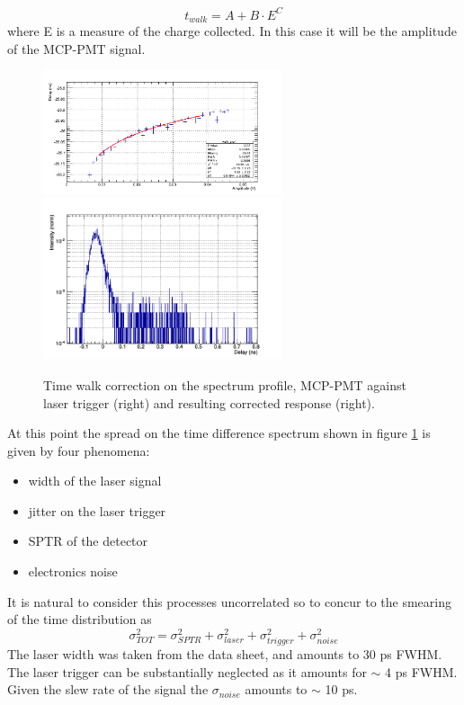 \begin{equation}
t_{walk} = A + B\cdot E^{C}
\end{equation}
where E is a measure of the charge collected. In this case it will be the amplitude of the MCP-PMT signal.
\begin{figure}[htbp]
\begin{center}
\includegraphics[width=7cm]{../Pictures/Chapter_8/time_walk_corr.png}
\includegraphics[width=7cm]{../Pictures/Chapter_8/laser.png}
\end{center}
\caption[MCP corrected response (laser trigger)]{Time walk correction on the spectrum profile, MCP-PMT against laser trigger (right) and resulting corrected response (right).}
\label{fig:mcp_laser_walk}
\end{figure}
At this point the spread on the time difference spectrum shown in figure \ref{fig:mcp_laser_walk} is given by four phenomena:
\begin{itemize}
\item width of the laser signal
\item jitter on the laser trigger
\item SPTR of the detector
\item electronics noise
\end{itemize}
It is natural to consider this processes uncorrelated so to concur to the smearing of the time distribution as
\begin{equation}
\sigma _{TOT}^{2} = \sigma _{SPTR}^{2} + \sigma _{laser}^{2} + \sigma _{trigger}^{2} + \sigma _{noise}^{2} 
\end{equation}
The laser width was taken from the data sheet, and amounts to 30 ps FWHM. The laser trigger can be substantially neglected as it amounts for $\sim$ 4 ps FWHM. Given the slew rate of the signal the $\sigma _{noise}$ amounts to $\sim$ 10 ps.

